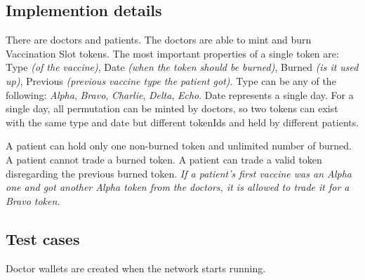 \subsection{Implemention details}
There are doctors and patients. The doctors are able to mint and burn Vaccination Slot tokens. The most important properties of a single token are: Type \emph{(of the vaccine)}, Date \emph{(when the token should be burned)}, Burned \emph{(is it used up)}, Previous \emph{(previous vaccine type the patient got)}.
Type can be any of the following: \emph{Alpha}, \emph{Bravo}, \emph{Charlie}, \emph{Delta}, \emph{Echo}. Date represents a single day. For a single day, all permutation can be minted by doctors, so two tokens can exist with the same type and date but different tokenIds and held by different patients.

A patient can hold only one non-burned token and unlimited number of burned. A patient cannot trade a burned token.
A patient can trade a valid token disregarding the previous burned token. \emph{If a patient's first vaccine was an Alpha one and got another Alpha token from the doctors, it is allowed to trade it for a Bravo token.}


\newpage
\subsection{Test cases}
Doctor wallets are created when the network starts running.




